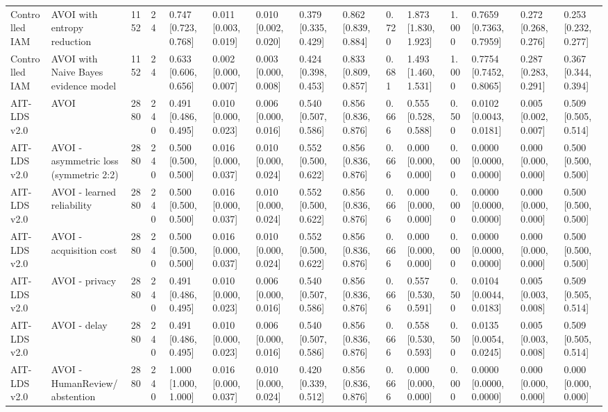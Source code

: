 \begin{table}[!ht]
{\begin{tabular}{lllllllllllllll}
Controlled IAM & AVOI with entropy reduction & 1152 & 24 & 0.747 [0.723, 0.768] & 0.011 [0.003, 0.019] & 0.010 [0.002, 0.020] & 0.379 [0.335, 0.429] & 0.862 [0.839, 0.884] & 0.720 & 1.873 [1.830, 1.923] & 1.000 & 0.7659 [0.7363, 0.7959] & 0.272 [0.268, 0.276] & 0.253 [0.232, 0.277] \\
Controlled IAM & AVOI with Naive Bayes evidence model & 1152 & 24 & 0.633 [0.606, 0.656] & 0.002 [0.000, 0.007] & 0.003 [0.000, 0.008] & 0.424 [0.398, 0.453] & 0.833 [0.809, 0.857] & 0.681 & 1.493 [1.460, 1.531] & 1.000 & 0.7754 [0.7452, 0.8065] & 0.287 [0.283, 0.291] & 0.367 [0.344, 0.394] \\
AIT-LDS v2.0 & AVOI & 2880 & 240 & 0.491 [0.486, 0.495] & 0.010 [0.000, 0.023] & 0.006 [0.000, 0.016] & 0.540 [0.507, 0.586] & 0.856 [0.836, 0.876] & 0.666 & 0.555 [0.528, 0.588] & 0.500 & 0.0102 [0.0043, 0.0181] & 0.005 [0.002, 0.007] & 0.509 [0.505, 0.514] \\
AIT-LDS v2.0 & AVOI - asymmetric loss (symmetric 2:2) & 2880 & 240 & 0.500 [0.500, 0.500] & 0.016 [0.000, 0.037] & 0.010 [0.000, 0.024] & 0.552 [0.500, 0.622] & 0.856 [0.836, 0.876] & 0.666 & 0.000 [0.000, 0.000] & 0.000 & 0.0000 [0.0000, 0.0000] & 0.000 [0.000, 0.000] & 0.500 [0.500, 0.500] \\
AIT-LDS v2.0 & AVOI - learned reliability & 2880 & 240 & 0.500 [0.500, 0.500] & 0.016 [0.000, 0.037] & 0.010 [0.000, 0.024] & 0.552 [0.500, 0.622] & 0.856 [0.836, 0.876] & 0.666 & 0.000 [0.000, 0.000] & 0.000 & 0.0000 [0.0000, 0.0000] & 0.000 [0.000, 0.000] & 0.500 [0.500, 0.500] \\
AIT-LDS v2.0 & AVOI - acquisition cost & 2880 & 240 & 0.500 [0.500, 0.500] & 0.016 [0.000, 0.037] & 0.010 [0.000, 0.024] & 0.552 [0.500, 0.622] & 0.856 [0.836, 0.876] & 0.666 & 0.000 [0.000, 0.000] & 0.000 & 0.0000 [0.0000, 0.0000] & 0.000 [0.000, 0.000] & 0.500 [0.500, 0.500] \\
AIT-LDS v2.0 & AVOI - privacy & 2880 & 240 & 0.491 [0.486, 0.495] & 0.010 [0.000, 0.023] & 0.006 [0.000, 0.016] & 0.540 [0.507, 0.586] & 0.856 [0.836, 0.876] & 0.666 & 0.557 [0.530, 0.591] & 0.500 & 0.0104 [0.0044, 0.0183] & 0.005 [0.003, 0.008] & 0.509 [0.505, 0.514] \\
AIT-LDS v2.0 & AVOI - delay & 2880 & 240 & 0.491 [0.486, 0.495] & 0.010 [0.000, 0.023] & 0.006 [0.000, 0.016] & 0.540 [0.507, 0.586] & 0.856 [0.836, 0.876] & 0.666 & 0.558 [0.530, 0.593] & 0.500 & 0.0135 [0.0054, 0.0245] & 0.005 [0.003, 0.008] & 0.509 [0.505, 0.514] \\
AIT-LDS v2.0 & AVOI - HumanReview/abstention & 2880 & 240 & 1.000 [1.000, 1.000] & 0.016 [0.000, 0.037] & 0.010 [0.000, 0.024] & 0.420 [0.339, 0.512] & 0.856 [0.836, 0.876] & 0.666 & 0.000 [0.000, 0.000] & 0.000 & 0.0000 [0.0000, 0.0000] & 0.000 [0.000, 0.000] & 0.000 [0.000, 0.000] \\

\end{tabular}}
\end{table}

